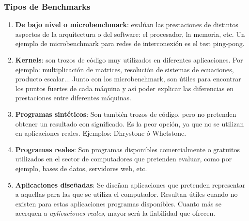\documentclass[10pt,a4paper,spanish]{report}
\begin{document}
\textcolor[rgb]{0.2,0.4,0.8}{\subsubsection{Tipos de Benchmarks}}
\begin{enumerate}[\color{azul}{\bf $\heartsuit$}]
  \item \textcolor[rgb]{0.2,0.4,0.8}{\textbf{De bajo nivel o microbenchmark}}: evalúan las prestaciones de distintos aspectos de la arquitectura o del software: el procesador, la memoria, etc. Un ejemplo de microbenchmark para redes de interconexión es el test ping-pong.
  \item \textcolor[rgb]{0.2,0.4,0.8}{\textbf{Kernels}}: son trozos de código muy utilizados en diferentes aplicaciones. Por ejemplo: multiplicación de matrices, resolución de sistemas de ecuaciones, producto escalar... Junto con los microbenchmark, son útiles para encontrar los puntos fuertes de cada máquina y así poder explicar las diferencias en prestaciones entre diferentes máquinas.
  \item \textcolor[rgb]{0.2,0.4,0.8}{\textbf{Programas sintéticos}}: Son también trozos de código, pero no pretenden obtener un resultado con significado. Es la peor opción, ya que no se utilizan en aplicaciones reales. Ejemplos: Dhrystone ó Whetstone.
  \item \textcolor[rgb]{0.2,0.4,0.8}{\textbf{Programas reales}}: Son programas disponibles comercialmente o gratuitos utilizados en el sector de computadores que pretenden evaluar, como por ejemplo, bases de datos, servidores web, etc.
  \item \textcolor[rgb]{0.2,0.4,0.8}{\textbf{Aplicaciones diseñadas}}: Se diseñan aplicaciones que pretenden representar a aquellas para las que se utiliza el computador. Resultan útiles cuando no existen para estas aplicaciones programas disponibles. Cuanto más se acerquen a \textit{\textcolor[rgb]{0.2,0.4,0.8}{aplicaciones reales}}, mayor será la fiabilidad que ofrecen.
\end{enumerate}
\end{document}
